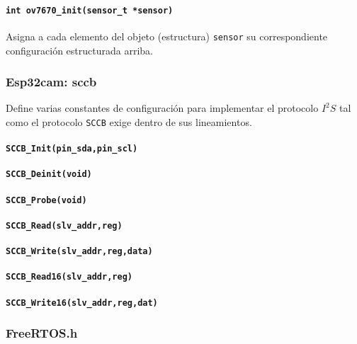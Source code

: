 \paragraph{\texttt{int ov7670\_init(sensor\_t *sensor)}}

Asigna a cada elemento del objeto (estructura) \texttt{sensor} su correspondiente configuración estructurada arriba.

\subsubsection{Esp32cam: sccb}

Define varias constantes de configuración para implementar el protocolo $I^2S$ tal como el protocolo \texttt{SCCB} exige dentro de sus lineamientos.

\paragraph{\texttt{SCCB\_Init(pin\_sda,pin\_scl)}}

\paragraph{\texttt{SCCB\_Deinit(void)}}

\paragraph{\texttt{SCCB\_Probe(void)}}

\paragraph{\texttt{SCCB\_Read(slv\_addr,reg)}}

\paragraph{\texttt{SCCB\_Write(slv\_addr,reg,data)}}

\paragraph{\texttt{SCCB\_Read16(slv\_addr,reg)}}

\paragraph{\texttt{SCCB\_Write16(slv\_addr,reg,dat)}}

\subsubsection{FreeRTOS.h}

